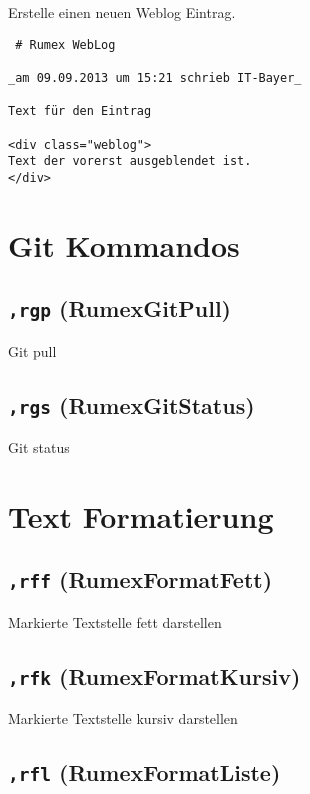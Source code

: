 Erstelle einen neuen Weblog Eintrag.

\begin{verbatim}
 # Rumex WebLog

_am 09.09.2013 um 15:21 schrieb IT-Bayer_

Text für den Eintrag

<div class="weblog">
Text der vorerst ausgeblendet ist.
</div>
\end{verbatim}

\section{Git Kommandos}\label{git-kommandos}

\subsection{\texttt{,rgp} (RumexGitPull)}\label{rgp-rumexgitpull}

Git pull

\subsection{\texttt{,rgs} (RumexGitStatus)}\label{rgs-rumexgitstatus}

Git status

\section{Text Formatierung}\label{text-formatierung}

\subsection{\texttt{,rff} (RumexFormatFett)}\label{rff-rumexformatfett}

Markierte Textstelle fett darstellen

\subsection{\texttt{,rfk}
(RumexFormatKursiv)}\label{rfk-rumexformatkursiv}

Markierte Textstelle kursiv darstellen

\subsection{\texttt{,rfl}
(RumexFormatListe)}\label{rfl-rumexformatliste}

